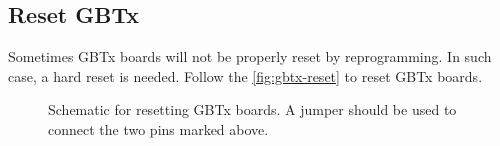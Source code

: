 \subsection{Reset GBTx}
Sometimes GBTx boards will not be properly reset by reprogramming. In such case,
a hard reset is needed.
Follow the \autoref{fig:gbtx-reset} to reset GBTx boards.

\begin{figure}[!ht]
\centering
{}
\caption{
    Schematic for resetting GBTx boards. A jumper should be used to connect the
    two pins marked above.
}
\label{fig:gbtx-reset}
\end{figure}
